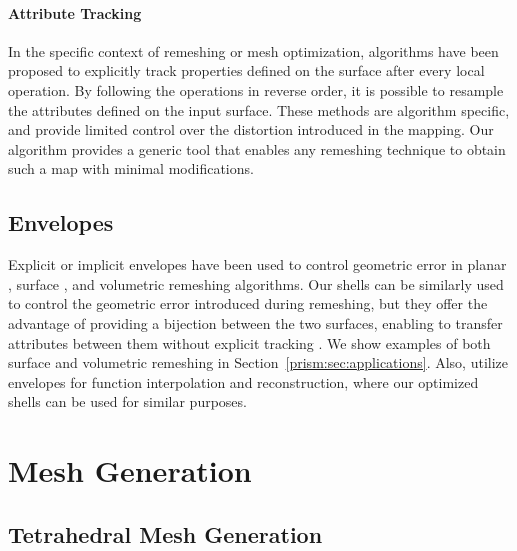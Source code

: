 \paragraph{Attribute Tracking}

In the specific context of remeshing or mesh optimization, algorithms have been proposed to explicitly track properties defined on the surface \cite{garland1997surface,cohen1997simplifying,dunyach2013adaptive} after every local operation. By following the operations in reverse order, it is possible to resample the attributes defined on the input surface. These methods are algorithm specific, and provide limited control over the distortion introduced in the mapping. Our algorithm provides a generic tool that enables any remeshing technique to obtain such a map with minimal modifications.

\subsection{Envelopes}
Explicit \cite{cohen1996simplification,cohen1997simplifying} or implicit \cite{hu2016error} envelopes have been used to control geometric error in planar \cite{hu2019triwild}, surface {\cite{gueziec1996surface,hu2017, Cheng2019}}, and volumetric \cite{hu2018tetrahedral,Hu:2019:fTetWild} remeshing algorithms. Our shells can be similarly used to control the geometric error introduced during remeshing, but they offer the advantage of providing a bijection between the two surfaces, enabling to transfer attributes between them without explicit tracking \cite{cohen1997simplifying}. We show examples of both surface and volumetric remeshing in Section~\ref{prism:sec:applications}.
{Also, \cite{barnhill_opitz_pottmann_1992,bajaj2002hierarchical} utilize envelopes for function interpolation and reconstruction, 
where our optimized shells can be used for similar purposes.}


\section{Mesh Generation}\label{cumin:sec:related}


\subsection{Tetrahedral Mesh Generation}

